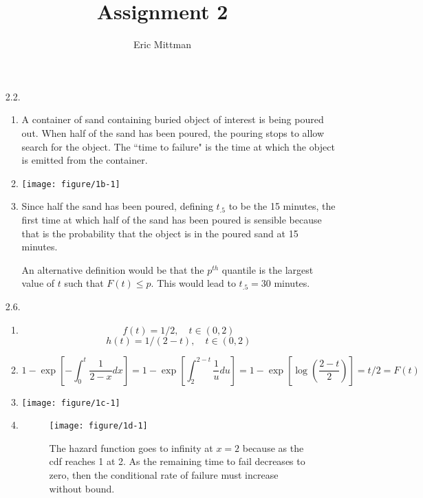 \documentclass[12pt]{article}\usepackage[]{graphicx}\usepackage[]{color}
\author{Eric Mittman}
\title{Assignment 2}
\newenvironment{knitrout}{}{} %
\begin{document}
\maketitle
\begin{enumerate}
\item[2.2.] 
\begin{enumerate}
  \item
  A container of sand containing buried object of interest is being poured out. When half of the sand has been poured, the pouring stops to allow search for the object. The ``time to failure" is the time at which the object is emitted from the container.
  
  \item
\begin{knitrout}
\color{fgcolor}
\texttt{[image: figure/1b-1]} 

\end{knitrout}
  \item Since half the sand has been poured, defining $t_{.5}$ to be the 15 minutes, the first time at which half of the sand has been poured is sensible because that is the probability that the object is in the poured sand at 15 minutes.
  
  An alternative definition would be that the $p^{th}$ quantile is the largest value of $t$ such that $F(t) \le p$. This would lead to $t_{.5} = 30$ minutes.
\end{enumerate}


\item[2.6.] 
\begin{enumerate}
  \item \[f(t) = 1/2, \quad t\in (0,2)\]
  \[h(t) = 1/(2-t), \quad t \in (0,2)\]
  \item 
  \[1-\exp\left[ -\int_{0}^{t}\frac{1}{2-x}dx\right] = 1-\exp\left[\int_{2}^{2-t}\frac{1}{u}du\right] = 1-\exp\left[ \log\left(\frac{2-t}{2}\right) \right] = t/2=F(t)\]
  \item
\begin{knitrout}
\color{fgcolor}
\texttt{[image: figure/1c-1]} 

\end{knitrout}
  \item 
\begin{knitrout}
\color{fgcolor}\begin{figure}[ht]
\texttt{[image: figure/1d-1]} \caption[The hazard function goes to infinity at ]{The hazard function goes to infinity at $x=2$ because as the cdf reaches 1 at 2. As the remaining time to fail decreases to zero, then the conditional rate of failure must increase without bound.}\label{fig:1d}
\end{figure}



\end{knitrout}
\end{enumerate}
\end{enumerate}
\end{document}
